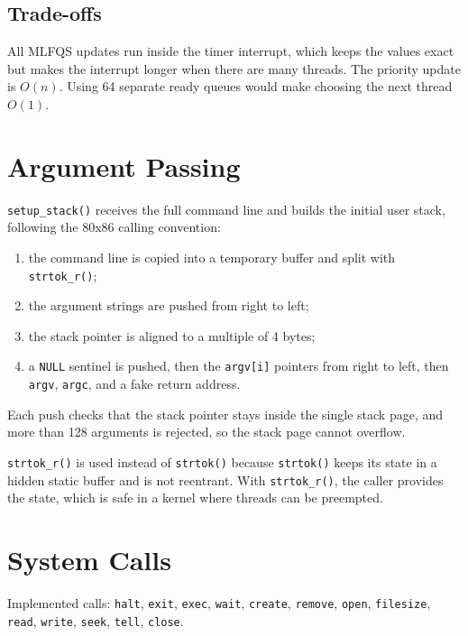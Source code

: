 \documentclass[a4paper,11pt]{article}
\newcommand{\code}[1]{\texttt{#1}}
\begin{document}
\subsection*{Trade-offs}
All MLFQS updates run inside the timer interrupt, which keeps the values exact but makes the interrupt longer when there are many threads. The priority update is $O(n)$. Using 64 separate ready queues would make choosing the next thread $O(1)$.

\section{Argument Passing}

\code{setup\_stack()} receives the full command line and builds the initial user stack, following the 80x86 calling convention:
\begin{enumerate}
  \item the command line is copied into a temporary buffer and split with \code{strtok\_r()};
  \item the argument strings are pushed from right to left;
  \item the stack pointer is aligned to a multiple of 4 bytes;
  \item a \code{NULL} sentinel is pushed, then the \code{argv[i]} pointers from right to left, then \code{argv}, \code{argc}, and a fake return address.
\end{enumerate}
Each push checks that the stack pointer stays inside the single stack page, and more than 128 arguments is rejected, so the stack page cannot overflow.

\code{strtok\_r()} is used instead of \code{strtok()} because \code{strtok()} keeps its state in a hidden static buffer and is not reentrant. With \code{strtok\_r()}, the caller provides the state, which is safe in a kernel where threads can be preempted.

\section{System Calls}

Implemented calls: \code{halt}, \code{exit}, \code{exec}, \code{wait}, \code{create}, \code{remove}, \code{open}, \code{filesize}, \code{read}, \code{write}, \code{seek}, \code{tell}, \code{close}.
\end{document}

